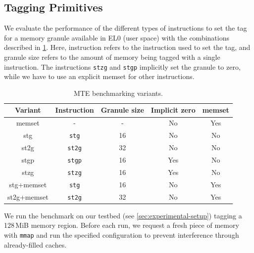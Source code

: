 \subsection{Tagging Primitives}
\label{subsec:tagging-primitives}

We evaluate the performance of the different types of instructions to set the tag for a memory granule available in EL0 (user space) with the combinations described in \cref{tab:stg-instructions}.
Here, instruction refers to the instruction used to set the tag, and granule size refers to the amount of memory being tagged with a single instruction.
The instructions \texttt{stzg} and \texttt{stgp} implicitly set the granule to zero, while we have to use an explicit memset for other instructions.

\begin{table}[h]
    \centering
    \small
    \caption{MTE benchmarking variants.}
    \label{tab:stg-instructions}
    \begin{tabular}{c || c | c | c | c }
        \textbf{Variant} & \textbf{Instruction} & \textbf{Granule size} & \textbf{Implicit zero} & \textbf{memset} \\
        \hline
        memset           & -                    & -                     & No                     & Yes             \\
        stg              & \texttt{stg}         & 16                    & No                     & No              \\
        st2g             & \texttt{st2g}        & 32                    & No                     & No              \\
        stgp             & \texttt{stgp}        & 16                    & Yes                    & No              \\
        stzg             & \texttt{stzg}        & 16                    & Yes                    & No              \\
        stg+memset       & \texttt{stg}         & 16                    & No                     & Yes             \\
        st2g+memset      & \texttt{st2g}        & 32                    & No                     & Yes             \\
    \end{tabular}
\end{table}

We run the benchmark on our testbed (see \cref{sec:experimental-setup}) tagging a 128\,MiB memory region.
Before each run, we request a fresh piece of memory with \texttt{mmap} and run the specified configuration to prevent interference through already-filled caches.

